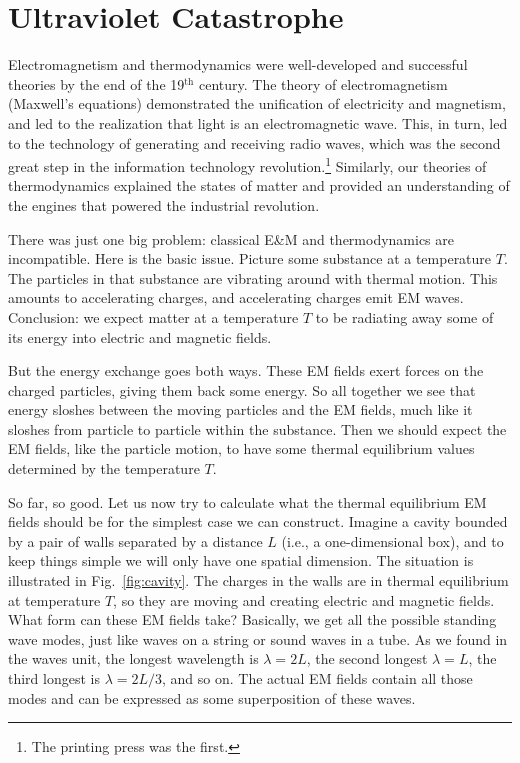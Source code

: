 \section{Ultraviolet Catastrophe}

Electromagnetism and thermodynamics were well-developed and successful
theories by the end of the 19$^\text{th}$ century.  The theory of
electromagnetism (Maxwell's equations) demonstrated the 
unification of electricity and magnetism, and led to the realization
that light is an electromagnetic wave.  This, in turn, led to the
technology of generating and receiving radio waves, which was the
second great step in the information technology revolution.\footnote{The
printing press was the first.}  Similarly, our theories of
thermodynamics explained the states of matter and provided an 
understanding of the engines that powered the industrial revolution.

There was just one big problem: classical E\&M and thermodynamics
are incompatible.  Here is the basic issue.  Picture some substance
at a temperature $T$.  The particles in that substance are vibrating
around with thermal motion.  This amounts to accelerating charges, and
accelerating charges emit EM waves.  Conclusion: we expect matter at a
temperature $T$ to be radiating away some of its energy into electric
and magnetic fields.

But the energy exchange goes both ways.  These EM fields exert forces
on the charged particles, giving them back some energy.  So all
together we see that energy sloshes between the moving particles and
the EM fields, much like it sloshes from particle to particle within
the substance.  Then we should expect the EM fields, like the particle
motion, to have some thermal equilibrium values determined by the
temperature $T$.

So far, so good.  Let us now try to calculate what the thermal
equilibrium EM fields should be for the simplest case we can
construct.  Imagine a cavity bounded by a pair of walls separated by a
distance $L$ (i.e., a one-dimensional box), and to keep things simple 
we will only have one spatial
dimension.  The situation is illustrated in Fig.~\ref{fig:cavity}. The
charges in the walls are in thermal equilibrium at temperature $T$, so
they are moving and creating electric and magnetic fields.  What form
can these EM fields take?  Basically, we get all the possible standing
wave modes, just like waves on a string or sound waves in a tube.  As
we found in the waves unit, the longest wavelength is $\lambda=2L$,
the second longest $\lambda=L$, the third longest is $\lambda=2L/3$,
and so on.  The actual EM fields contain all those modes and can be
expressed as some superposition of these waves.

